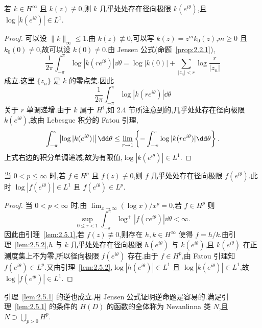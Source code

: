 \begin{lemma}\label{lem:2.5.2}
若 $k \in H^{\infty}$ 且 $k(z) \not\equiv 0$,则 $k$ 几乎处处存在径向极限 $k(e^{i\theta})$,且 $\log|k(e^{i\theta})| \in L^{1}$.
\end{lemma}

\begin{proof}
可以设 $\|k\|_{\infty} \leq 1$.由 $k(z) \not\equiv 0$,可以写 $k(z) = z^{m}k_{0}(z)$,$m \geq 0$ 且 $k_{0}(0) \neq 0$,故可以设 $k(0) \neq 0$.由 Jensen 公式(命题~\ref{prop:2.2.1}),
\begin{equation*}
\frac{1}{2\pi}\int_{-\pi}^{\pi}\log|k(re^{i\theta})|\dd\theta = \log|k(0)| + \sum_{|z_{n}| < r}\log\frac{r}{|z_{n}|}
\end{equation*}
成立.这里 $\{z_{n}\}$ 是 $k$ 的零点集.因此
\begin{equation*}
\frac{1}{2\pi}\int_{-\pi}^{\pi}\log|k(re^{i\theta})|\dd\theta
\end{equation*}
关于 $r$ 单调递增.由于 $k$ 属于 $H^{1}$,如 2.4 节所注意到的,几乎处处存在径向极限 $k(e^{i\theta})$,故由 Lebesgue 积分的 Fatou 引理,
\begin{equation*}
\int_{-\pi}^{\pi}\left|\log|k(e^{i\theta})|\right|\dd\theta \leq \varliminf_{r \to 1}\left\{-\int_{-\pi}^{\pi}\log|k(re^{i\theta})|\dd\theta\right\}.
\end{equation*}
上式右边的积分单调递减,故为有限值,$\log|k(e^{i\theta})| \in L^{1}$.
\end{proof}

\begin{theorem}\label{thm:2.5.3}
当 $0 < p \leq \infty$ 时,若 $f \in H^{p}$ 且 $f(z) \not\equiv 0$,则 $f$ 几乎处处存在径向极限 $f(e^{i\theta})$.此时 $\log|f(e^{i\theta})| \in L^{1}$ 且 $f(e^{i\theta}) \in L^{p}$.
\end{theorem}

\begin{proof}
当 $0 < p < \infty$ 时,由 $\lim_{x \to \infty}(\log x)/x^{p} = 0$,若 $f \in H^{p}$ 则
\begin{equation*}
\sup_{0 \leq r < 1}\int_{-\pi}^{\pi}\log^{+}|f(re^{i\theta})|\dd\theta < \infty.
\end{equation*}
因此由引理~\ref{lem:2.5.1},若 $f(z) \not\equiv 0$,则存在 $h, k \in H^{\infty}$ 使得 $f = h/k$.由引理~\ref{lem:2.5.2},$h$ 与 $k$ 几乎处处存在径向极限 $h(e^{i\theta})$ 与 $k(e^{i\theta})$,且 $k(e^{i\theta})$ 在正测度集上不为零,所以径向极限 $f(e^{i\theta})$ 存在.由于 $f \in H^{p}$,由 Fatou 引理知 $f(e^{i\theta}) \in L^{p}$.又由引理~\ref{lem:2.5.2},$\log|h(e^{i\theta})| \in L^{1}$ 且 $\log|k(e^{i\theta})| \in L^{1}$,故 $\log|f(e^{i\theta})| \in L^{1}$.
\end{proof}

引理~\ref{lem:2.5.1} 的逆也成立.用 Jensen 公式证明逆命题是容易的.满足引理~\ref{lem:2.5.1} 的条件的 $H(D)$ 的函数的全体称为 Nevanlinna 类 $N$,且 $N \supset \bigcup_{p > 0}H^{p}$.
